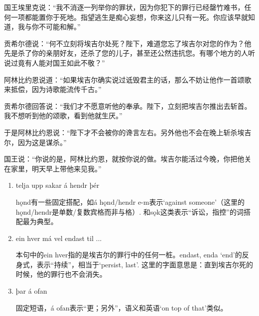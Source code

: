 \begin{translation*}{}
    国王埃里克说：“我不消逐一列举你的罪状，因为你犯下的罪行已经罄竹难书，任何一项都能置你于死地。指望逃生是痴心妄想，你来这儿只有一死。你应该早就知道，我与你不可能和解。”

    贡希尔德说：“何不立刻将埃吉尔处死？陛下，难道您忘了埃吉尔对您的作为？他先是杀了你的亲朋好友，还杀了您的儿子，甚至还公然违抗您。有哪个地方的人听说过竟有人能对国王如此不敬？”

    阿林比约恩说道：“如果埃吉尔确实说过诋毁君主的话，那么不妨让他作一首颂歌来抵偿，因为诗歌能流传千古。”

    贡希尔德回答说：“我们才不愿意听他的奉承。陛下，立刻把埃吉尔推出去斩首。我不想听到他的颂歌，看到他就生厌。”

    于是阿林比约恩说：“陛下才不会被你的谗言左右。另外他也不会在晚上斩杀埃吉尔，因为这是谋杀。”

    国王说：“你说的是，阿林比约恩，就按你说的做。埃吉尔能活过今晚，你把他关在家里，明天早上带他来见我。”

\end{translation*}
\begin{grammar*}{}
    \begin{enumerate}[leftmargin=*]
        \item telja upp sakar á hendr þér

              hǫnd有一些固定搭配，如á hǫnd/hendr e-m表示`against someone'（这里的hǫnd/hendr是单数/复数宾格而非与格）. 和sǫk这类表示“诉讼，指控”的词搭配最为典型。

        \item ein hver má vel endast til ...

              本句中的ein hver指的是埃吉尔的罪行中的任何一桩。endast, enda `end'的反身式，表示“持续”，相当于`persist, last'. 这里的字面意思是：直到埃吉尔死的时候，他的罪行也不会消失。

        \item þar á ofan

              固定短语，á ofan表示“更；另外”，语义和英语`on top of that'类似。
    \end{enumerate}
\end{grammar*}

